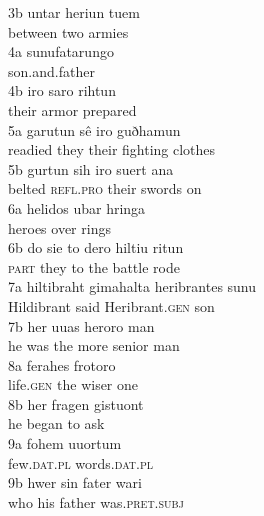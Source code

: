3b \tab \gll untar     heriun  tuem\\
        between   two     armies\\

4a \tab \gll sunufatarungo\\
        son.and.father\\

4b \tab \gll iro    saro   rihtun\\
        their   armor  prepared\\

5a \tab \gll garutun  sê    iro     guðhamun\\
        readied  they    their   {fighting clothes}\\

5b \tab \gll gurtun  sih        iro     suert  ana\\
        belted   \textsc{refl.pro}  their  swords   on\\

6a \tab \gll helidos   ubar  hringa\\
        heroes  over   rings\\

6b \tab \gll do     sie    to  dero   hiltiu  ritun\\
        \textsc{part}  they   to  the    battle  rode\\

7a \tab \gll hiltibraht   gimahalta   heribrantes     sunu\\
        Hildibrant  said     Heribrant.\textsc{gen}  son\\

7b \tab \gll her  uuas   heroro       man\\
        he   was   the more senior   man\\

8a \tab \gll ferahes     frotoro\\
        life.\textsc{gen}    {the wiser one}\\

8b \tab \gll her  fragen   gistuont\\
        he   began   to ask\\

9a \tab \gll fohem    uuortum\\
        few.\textsc{dat.pl}  words.\textsc{dat.pl}\\

9b \tab \gll hwer  sin  fater  wari\\
        who   his  father   was.\textsc{pret.subj}\\

